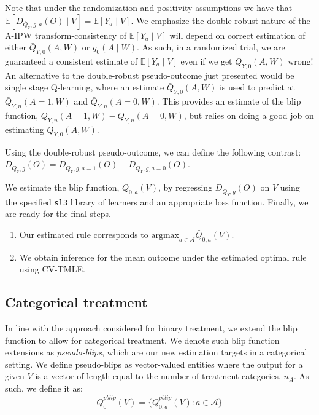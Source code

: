 \documentclass[
  12pt, krantz2,
]{krantz}
\newcommand{\passthrough}[1]{#1}
\providecommand{\tightlist}{%
  \setlength{\itemsep}{0pt}\setlength{\parskip}{0pt}}
\theoremstyle{definition}
\theoremstyle{definition}
\theoremstyle{definition}
\newcommand{\E}{\mathbb{E}}
\newcommand{\1}{\mathbbm{1}}
\begin{document}
Note that under the randomization and positivity assumptions we have that
\(\E[D_{\bar{Q}_Y,g,a}(O) \mid V] = \E[Y_a \mid V]\). We emphasize the double
robust nature of the A-IPW transform-consistency of \(\E[Y_a \mid V]\) will depend
on correct estimation of either \(\bar{Q}_{Y,0}(A,W)\) or \(g_0(A \mid W)\). As
such, in a randomized trial, we are guaranteed a consistent estimate of \(\E[Y_a \mid V]\)
even if we get \(\bar{Q}_{Y,0}(A,W)\) wrong! An alternative to the double-robust pseudo-outcome
just presented would be single stage Q-learning, where an estimate \(\bar{Q}_{Y,0}(A,W)\)
is used to predict at \(\bar{Q}_{Y,n}(A=1,W)\) and \(\bar{Q}_{Y,n}(A=0,W)\). This provides
an estimate of the blip function, \(\bar{Q}_{Y,n}(A=1,W) - \bar{Q}_{Y,n}(A=0,W)\), but
relies on doing a good job on estimating \(\bar{Q}_{Y,0}(A,W)\).

Using the double-robust pseudo-outcome, we can define the following contrast:
\(D_{\bar{Q}_Y,g}(O) = D_{\bar{Q}_Y, g, a=1}(O) - D_{\bar{Q}_Y, g, a=0}(O).\)

We estimate the blip function, \(\bar{Q}_{0,a}(V)\), by regressing
\(D_{\bar{Q}_Y,g}(O)\) on \(V\) using the specified \passthrough{\lstinline!sl3!} library of learners and an
appropriate loss function. Finally, we are ready for the final steps.

\begin{enumerate}
\def\labelenumi{\arabic{enumi}.}
\setcounter{enumi}{2}
\tightlist
\item
  Our estimated rule corresponds to \(\text{argmax}_{a \in \mathcal{A}} \bar{Q}_{0,a}(V)\).
\item
  We obtain inference for the mean outcome under the estimated optimal rule
  using CV-TMLE.
\end{enumerate}

\hypertarget{categorical-treatment}{%
\subsection{Categorical treatment}\label{categorical-treatment}}

In line with the approach considered for binary treatment, we extend the blip
function to allow for categorical treatment. We denote such blip function
extensions as \emph{pseudo-blips}, which are our new estimation targets in a
categorical setting. We define pseudo-blips as vector-valued entities where the
output for a given \(V\) is a vector of length equal to the number of treatment
categories, \(n_A\). As such, we define it as:
\[\bar{Q}_0^{pblip}(V) = \{\bar{Q}_{0,a}^{pblip}(V): a \in \mathcal{A} \}\]
\end{document}
